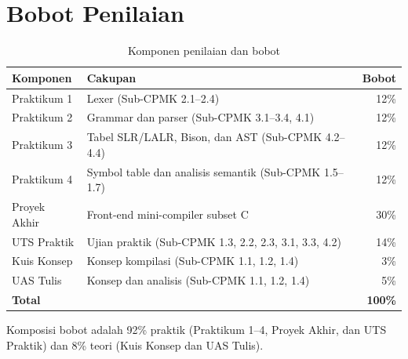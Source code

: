 \section*{Bobot Penilaian}

\begin{table}[H]
\centering
\caption{Komponen penilaian dan bobot}
\label{tab:bobot-penilaian}
\begin{tabularx}{\textwidth}{@{}lXr@{}}
\toprule
\textbf{Komponen} & \textbf{Cakupan} & \textbf{Bobot} \\
\midrule
Praktikum 1 & Lexer (Sub-CPMK 2.1--2.4) & 12\% \\
Praktikum 2 & Grammar dan parser (Sub-CPMK 3.1--3.4, 4.1) & 12\% \\
Praktikum 3 & Tabel SLR/LALR, Bison, dan AST (Sub-CPMK 4.2--4.4) & 12\% \\
Praktikum 4 & Symbol table dan analisis semantik (Sub-CPMK 1.5--1.7) & 12\% \\
Proyek Akhir & Front-end mini-compiler subset C & 30\% \\
UTS Praktik & Ujian praktik (Sub-CPMK 1.3, 2.2, 2.3, 3.1, 3.3, 4.2) & 14\% \\
Kuis Konsep & Konsep kompilasi (Sub-CPMK 1.1, 1.2, 1.4) & 3\% \\
UAS Tulis & Konsep dan analisis (Sub-CPMK 1.1, 1.2, 1.4) & 5\% \\
\midrule
\textbf{Total} & & \textbf{100\%} \\
\bottomrule
\end{tabularx}
\end{table}

Komposisi bobot adalah 92\% praktik (Praktikum 1--4, Proyek Akhir, dan
UTS Praktik) dan 8\% teori (Kuis Konsep dan UAS Tulis).
